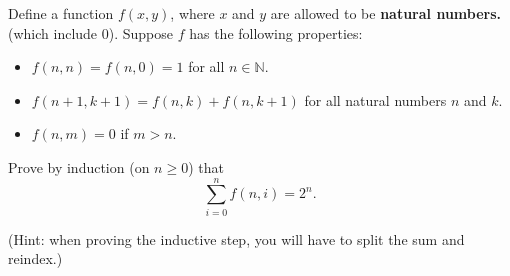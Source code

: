 Define a function $f(x,y)$, where $x$ and $y$ are allowed to be \textbf{natural numbers.} (which include $0$). Suppose $f$ has the following properties:
\begin{itemize}
    \item $f(n, n) = f(n, 0) = 1$ for all $n \in \mathbb{N}$.
    \item $f(n + 1, k + 1) = f(n, k) + f(n, k + 1)$ for all natural numbers $n$ and $k$.
    \item $f(n, m) = 0$ if $m > n$.
\end{itemize}

Prove by induction (on $n \geq 0$) that
\[\sum_{i = 0}^nf(n, i) = 2^n.\]

(Hint: when proving the inductive step, you will have to split the sum and reindex.)